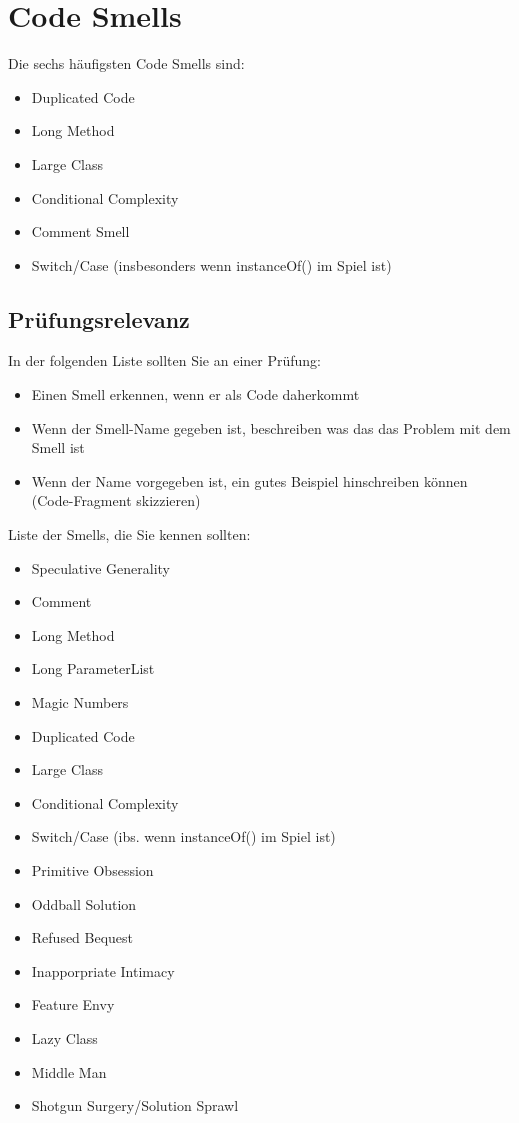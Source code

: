 \section{Code Smells}

Die sechs häufigsten Code Smells sind:

\begin{itemize}
	\item Duplicated Code
	\item Long Method
	\item Large Class
	\item Conditional Complexity
	\item Comment Smell
	\item Switch/Case (insbesonders wenn instanceOf() im Spiel ist)
\end{itemize}


\subsection{Prüfungsrelevanz}

In der folgenden Liste sollten Sie an einer Prüfung:
\begin{itemize}
	\item Einen Smell erkennen, wenn er als Code daherkommt
	\item Wenn der Smell-Name gegeben ist, beschreiben was das das Problem mit dem Smell ist
	\item Wenn der Name vorgegeben ist, ein gutes Beispiel hinschreiben können (Code-Fragment skizzieren)
\end{itemize}

Liste der Smells, die Sie kennen sollten:

\begin{multicols}{2}
	\begin{itemize}
		\item Speculative Generality
		\item Comment
		\item Long Method
		\item Long ParameterList
		\item Magic Numbers
		\item Duplicated Code
		\item Large Class
		\item Conditional Complexity
		\item Switch/Case (ibs. wenn instanceOf() im Spiel ist)
		\item Primitive Obsession
		\item Oddball Solution
		\item Refused Bequest
		\item Inapporpriate Intimacy
		\item Feature Envy
		\item Lazy Class
		\item Middle Man
		\item Shotgun Surgery/Solution Sprawl
	\end{itemize}
\end{multicols}

